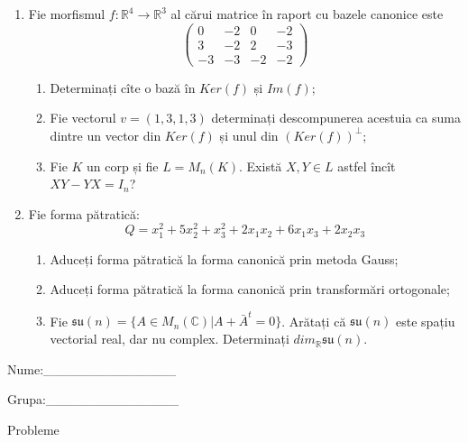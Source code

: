 \documentclass{article}
\begin{document}
\begin{enumerate}
 \item Fie morfismul $f:\mathbb{R}^4 \to \mathbb{R}^3$ al cărui matrice în raport cu bazele canonice este
$$\begin{pmatrix}
0&-2&0&-2\\
3&-2&2&-3\\
-3&-3&-2&-2
\end{pmatrix}$$

\begin{enumerate}
\item Determinați cîte o bază în $Ker(f)$ și $Im(f)$;
\item Fie vectorul $v=(1,3,1,3)$ determinați descompunerea acestuia ca suma dintre un vector din $Ker(f)$ și unul din $(Ker(f))^\perp$;
\item Fie $K$ un corp și fie $L=M_n(K)$. Există $X,Y \in L$ astfel încît $XY-YX=I_n$?  
\end{enumerate}
\item Fie forma pătratică:
$$Q= x_1^2+5x_2^2+x_3^2+2x_1x_2+6x_1x_3+2x_2x_3$$

\begin{enumerate}
\item Aduceți forma pătratică la forma canonică prin metoda Gauss;
\item Aduceți forma pătratică la forma canonică prin transformări ortogonale;
\item Fie $\mathfrak{su}(n)=\{ A \in M_n(\mathbb{C}) | A+\bar{A}^t=0\}$. Arătați că $\mathfrak{su}(n)$ este spațiu vectorial real, dar nu complex.
Determinați $dim_{\mathbb{R}}\mathfrak{su}(n)$.
\end{enumerate}
\end{enumerate}
\newpage
\begin{flushright}
Nume:\_\_\_\_\_\_\_\_\_\_\_\_\_\_
 
 
Grupa:\_\_\_\_\_\_\_\_\_\_\_\_\_\_
\end{flushright}
\begin{center}
\vspace{2cm}
{\Large Probleme}
\vspace{2cm}
\end{center}
\end{document}
